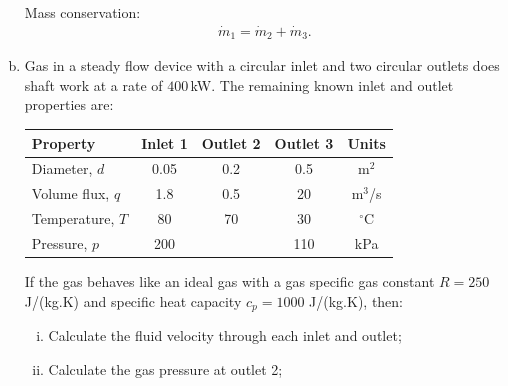 \documentclass[calculator,steamtables,refrigeranttables,psychrometricchart,datasheet]{exam}
\begin{document}
\begin{question}
\begin{enumerate}[(a)]
{Mass conservation:
\begin{align*}
 \dot{m}_1 = \dot{m}_2 + \dot{m}_3.
\end{align*}
}

\item Gas in a steady flow device with a circular inlet and two circular outlets does shaft work at a rate of $400$\,kW. The remaining known inlet and outlet properties are: 
\begin{center}
\begin{tabular}{|l |c |c |c |c |}
\hline
Property            & Inlet 1 & Outlet 2 & Outlet 3 & Units       \\
\hline
Diameter, $d$       & 0.05    & 0.2      & 0.5      & m$^{2}$     \\
Volume flux, $q$    & 1.8     & 0.5      & 20       & m$^{3}$/s   \\
Temperature, $T$    & 80      & 70       & 30       & $^{\circ}$C \\
Pressure, $p$       & 200     &          & 110      & kPa         \\
\hline 
\end{tabular}
\end{center}
If the gas behaves like an ideal gas with a gas specific gas constant $R=250$\,J/(kg.K) and specific heat capacity $c_{p}=1000$ J/(kg.K), then:
\begin{enumerate}[(i)]
\item Calculate the fluid velocity through each inlet and outlet; 

\item Calculate the gas pressure at outlet 2; 
\end{enumerate}
\end{enumerate}
\end{question}
\end{document}
